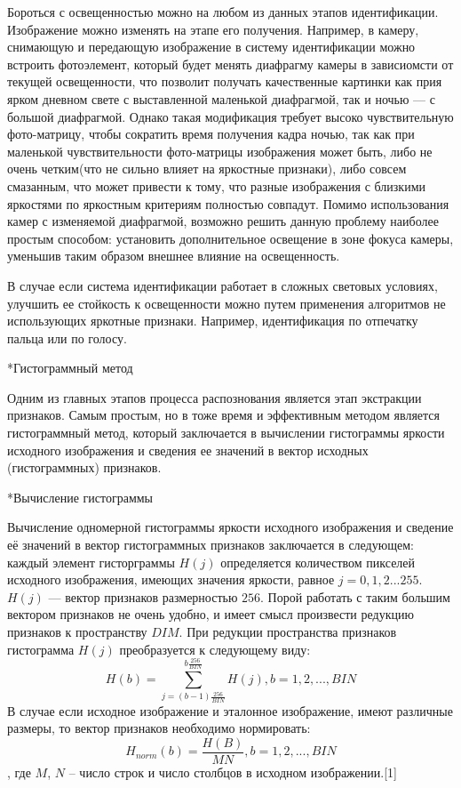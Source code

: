 \documentclass[a4paper,12pt,titlpage]{posobie}
\makeatletter
\renewcommand{\section}{\@startsection{section}{1}{0.0cm}{0.5cm}{0.1cm}%
             {\fontsize{16}{16}\bf\selectfont }}
\renewcommand{\subsection}{\@startsection{subsection}{2}{0.0cm}{0.3cm}{0.1cm}%
             {\fontsize{14}{16}\bf\selectfont }}
\makeatother
\begin{document}
Бороться с освещенностью можно на любом из данных этапов идентификации. Изображение можно изменять на этапе его получения. Например, в 
камеру, снимающую и передающую изображение в систему идентификации можно встроить фотоэлемент, который будет менять диафрагму камеры в 
зависиомсти от текущей освещенности, что позволит получать качественные картинки как прия ярком дневном свете с выставленной маленькой 
диафрагмой, так и ночью --- с большой диафрагмой. Однако такая модификация требует высоко чувствительную фото-матрицу, чтобы сократить 
время получения кадра ночью, так как при маленькой чувствительности фото-матрицы изображения может быть, либо не очень четким(что не сильно
влияет на яркостные признаки), либо совсем смазанным, что может привести к тому, что разные  изображения с близкими яркостями по яркостным
критериям полностью совпадут. Помимо использования камер с изменяемой диафрагмой, возможно решить данную проблему наиболее простым способом:
установить дополнительное освещение в зоне фокуса камеры, уменьшив таким образом внешнее влияние на освещенность.

В случае если система идентификации работает в сложных световых условиях, улучшить ее стойкость к освещенности можно путем применения 
алгоритмов не использующих яркотные признаки. Например, идентификация по отпечатку пальца или по голосу.

\section*{Гистограммный метод}
     Одним из главных этапов процесса распознования является этап экстракции признаков. Самым простым, но в тоже время
и эффективным методом является гистограммный метод, который заключается в вычислении гистограммы яркости исходного изображения и 
сведения ее значений в вектор исходных (гистограммных) признаков. 


\subsection*{Вычисление гистограммы}

    Вычисление одномерной гистограммы яркости исходного изображения и сведение её значений в вектор гистограммных признаков заключается 
в следующем: каждый элемент гисторграммы $H(j)$ определяется количеством пикселей исходного изображения, имеющих значения яркости, равное 
$j=0,1,2 ... 255$. $H(j)$ --- вектор признаков размерностью $256$. Порой работать с таким большим вектором признаков не очень удобно, и имеет 
смысл произвести редукцию признаков к пространству $DIM$. При редукции пространства признаков гистограмма $H(j)$ 
преобразуется к следующему виду:
\[ H(b) = \sum_{j=(b-1)\frac{256}{BIN}}^{b\frac{256}{BIN}} H(j), b = 1,2,...,BIN \]
В случае если исходное изображение и эталонное изображение, имеют различные размеры, то вектор признаков необходимо нормировать:
\[ H_{norm}(b) = \frac{H(B)}{MN}, b = 1,2,..., BIN \],
где $M$, $N$ -- число строк и число столбцов в исходном изображении.[1]
\end{document}
